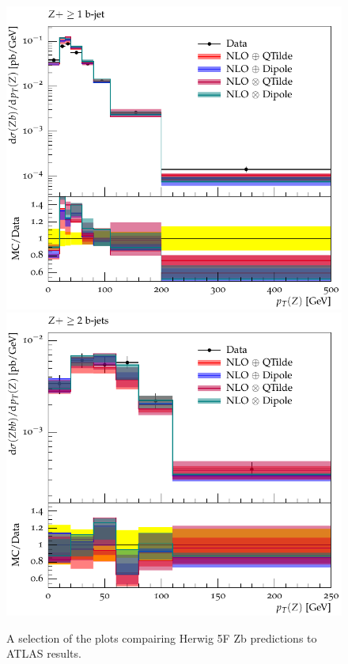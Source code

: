 \documentclass[11pt]{cernrep} \usepackage{graphicx,epsfig} 
\begin{document}
\begin{figure}[htbp]
\begin{center}
   \includegraphics[scale=0.65]{figs/zbb/herwigzb/d15-x01-y01.pdf} 
   \includegraphics[scale=0.65]{figs/zbb/herwigzb/d25-x01-y01.pdf} 
\caption{A selection of the plots compairing Herwig 5F Zb predictions to ATLAS results.}
\label{zbb-herwigzb-atlas}
\end{center}
\end{figure}
\end{document}
